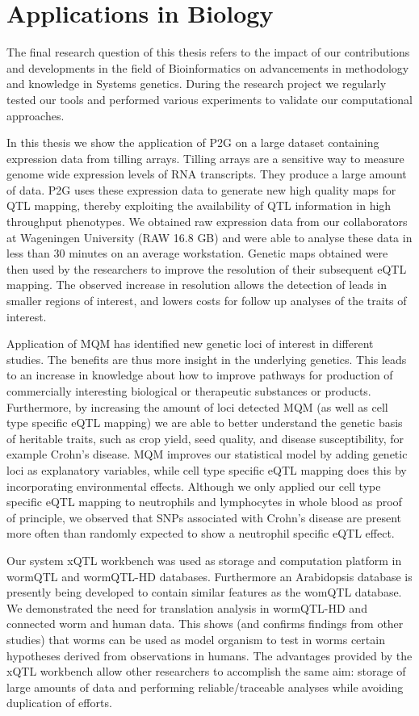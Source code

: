 \section{Applications in Biology}
The final research question of this thesis refers to the impact of our contributions and developments  in the field of Bioinformatics on advancements 
in methodology and knowledge in Systems genetics. During the research project we regularly tested our tools and performed various experiments to 
validate our computational approaches. 

In this thesis we show the application of P2G on a large dataset containing expression data from tilling arrays. Tilling arrays are a sensitive way to 
measure genome wide expression levels of RNA transcripts. They produce a large amount of data. P2G uses these expression data to generate new high 
quality maps for QTL mapping, thereby exploiting the availability of QTL information in high throughput phenotypes. We obtained raw expression data from 
our collaborators at Wageningen University (RAW 16.8 GB) and were able to analyse these data in less than 30 minutes on an average workstation. Genetic 
maps obtained were then used by the researchers to improve the resolution of their subsequent eQTL mapping. The observed increase in resolution allows 
the detection of leads in smaller regions of interest, and lowers costs for follow up analyses of the traits of interest.

Application of MQM has identified new genetic loci of interest in different studies. The benefits are thus more insight in the underlying genetics. 
This leads to an increase in knowledge about how to improve pathways for production of commercially interesting biological or therapeutic substances 
or products. Furthermore, by increasing the amount of loci detected MQM (as well as cell type specific eQTL mapping) we are able to better understand 
the genetic basis of heritable traits, such as crop yield, seed quality, and disease susceptibility, for example Crohn's disease. MQM improves our 
statistical model by adding genetic loci as explanatory variables, while cell type specific eQTL mapping does this by incorporating environmental 
effects. Although we only applied our cell type specific eQTL mapping to neutrophils and lymphocytes in whole blood as proof of principle, we 
observed that SNPs associated with Crohn’s disease are present more often than randomly expected to show a neutrophil specific eQTL effect.

Our system xQTL workbench was used as storage and computation platform in wormQTL and wormQTL-HD databases. Furthermore an Arabidopsis database is 
presently being developed to contain similar features as the womQTL database. We demonstrated the need for translation analysis in wormQTL-HD and 
connected worm and human data. This shows (and confirms findings from other studies) that worms can be used as model organism to test in worms certain 
hypotheses derived from observations in humans. The advantages provided by the xQTL workbench allow other researchers to accomplish the same aim: 
storage of large amounts of data and performing reliable/traceable analyses while avoiding duplication of efforts.

